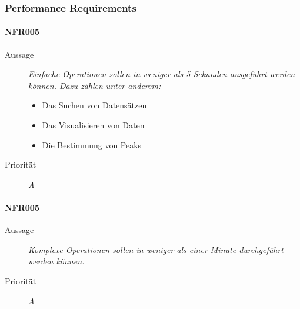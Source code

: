 \subsubsection{Performance Requirements}

\paragraph{NFR005}
\begin{description}
     \item[Aussage]
        \textit{Einfache Operationen sollen in weniger als 5 Sekunden ausgef\"uhrt werden k\"onnen. Dazu z\"ahlen unter anderem:}
        \begin{itemize}
	      \item Das Suchen von Datens\"atzen
	      \item Das Visualisieren von Daten
	      \item Die Bestimmung von Peaks
   	   \end{itemize}
    \item [Priorit\"at] \textit{A}
\end{description}

\paragraph{NFR005}
\begin{description}
     \item[Aussage]
        \textit{Komplexe Operationen sollen in weniger als einer Minute durchgef\"uhrt werden k\"onnen.}
    \item [Priorit\"at] \textit{A}
\end{description}